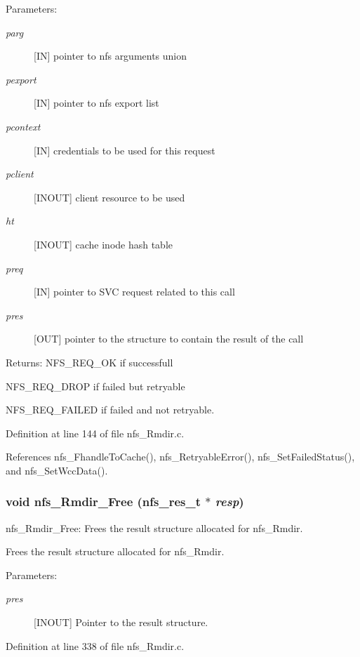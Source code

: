 \begin{Desc}
\item[Parameters:]
\begin{description}
\item[{\em parg}][IN] pointer to nfs arguments union \item[{\em pexport}][IN] pointer to nfs export list \item[{\em pcontext}][IN] credentials to be used for this request \item[{\em pclient}][INOUT] client resource to be used \item[{\em ht}][INOUT] cache inode hash table \item[{\em preq}][IN] pointer to SVC request related to this call \item[{\em pres}][OUT] pointer to the structure to contain the result of the call\end{description}
\end{Desc}
\begin{Desc}
\item[Returns:]NFS\_\-REQ\_\-OK if successfull \par
 NFS\_\-REQ\_\-DROP if failed but retryable \par
 NFS\_\-REQ\_\-FAILED if failed and not retryable. \end{Desc}


Definition at line 144 of file nfs\_\-Rmdir.c.

References nfs\_\-Fhandle\-To\-Cache(), nfs\_\-Retryable\-Error(), nfs\_\-Set\-Failed\-Status(), and nfs\_\-Set\-Wcc\-Data().
\subsubsection{\setlength{\rightskip}{0pt plus 5cm}void nfs\_\-Rmdir\_\-Free (nfs\_\-res\_\-t $\ast$ {\em resp})}\label{nfs__Rmdir_8c_a1}


nfs\_\-Rmdir\_\-Free: Frees the result structure allocated for nfs\_\-Rmdir.

Frees the result structure allocated for nfs\_\-Rmdir.

\begin{Desc}
\item[Parameters:]
\begin{description}
\item[{\em pres}][INOUT] Pointer to the result structure. \end{description}
\end{Desc}


Definition at line 338 of file nfs\_\-Rmdir.c.